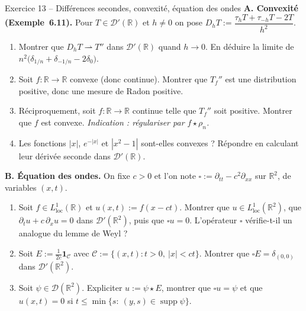 \documentclass[11pt,a4paper]{article}
\newcommand{\R}{\mathbb{R}}
\newcommand{\wk}{\rightharpoonup}
\DeclareMathOperator{\supp}{supp}
\newcommand{\D}{\mathcal{D}}
\theoremstyle{definition}
\begin{document}
\begin{exo}{Exercice 13 -- Différences secondes, convexité, équation des ondes}
\textbf{A. Convexité (Exemple~6.11).} Pour $T\in\D'(\R)$ et $h\ne0$ on pose $D_hT:=\dfrac{\tau_hT+\tau_{-h}T-2T}{h^2}$.
\begin{enumerate}[label=(\alph*)]
  \item Montrer que $D_hT\wk T''$ dans $\D'(\R)$ quand $h\to0$. En déduire la limite de $n^2\big(\delta_{1/n}+\delta_{-1/n}-2\delta_0\big)$.
  \item Soit $f:\R\to\R$ convexe (donc continue). Montrer que $T_f''$ est une distribution positive, donc une mesure de Radon positive.
  \item Réciproquement, soit $f:\R\to\R$ continue telle que $T_f''$ soit positive. Montrer que $f$ est convexe. \emph{Indication : régulariser par $f\star\rho_n$.}
  \item Les fonctions $|x|$, $e^{-|x|}$ et $|x^2-1|$ sont-elles convexes ? Répondre en calculant leur dérivée seconde dans $\D'(\R)$.
\end{enumerate}
\textbf{B. Équation des ondes.} On fixe $c>0$ et l'on note $\square:=\partial_{tt}-c^2\partial_{xx}$ sur $\R^2$, de variables $(x,t)$.
\begin{enumerate}[label=(\alph*),resume]
  \item Soit $f\in L^1_{\mathrm{loc}}(\R)$ et $u(x,t):=f(x-ct)$. Montrer que $u\in L^1_{\mathrm{loc}}(\R^2)$, que $\partial_tu+c\,\partial_xu=0$ dans $\D'(\R^2)$, puis que $\square u=0$. L'opérateur $\square$ vérifie-t-il un analogue du lemme de Weyl ?
  \item Soit $E:=\frac1{2c}\mathbf 1_{\mathcal C}$ avec $\mathcal C:=\{(x,t):t>0,\ |x|<ct\}$. Montrer que $\square E=\delta_{(0,0)}$ dans $\D'(\R^2)$.
  \item Soit $\psi\in\D(\R^2)$. Expliciter $u:=\psi\star E$, montrer que $\square u=\psi$ et que $u(x,t)=0$ si $t\le\min\{s:\ (y,s)\in\supp\psi\}$.
\end{enumerate}
\end{exo}
\end{document}
